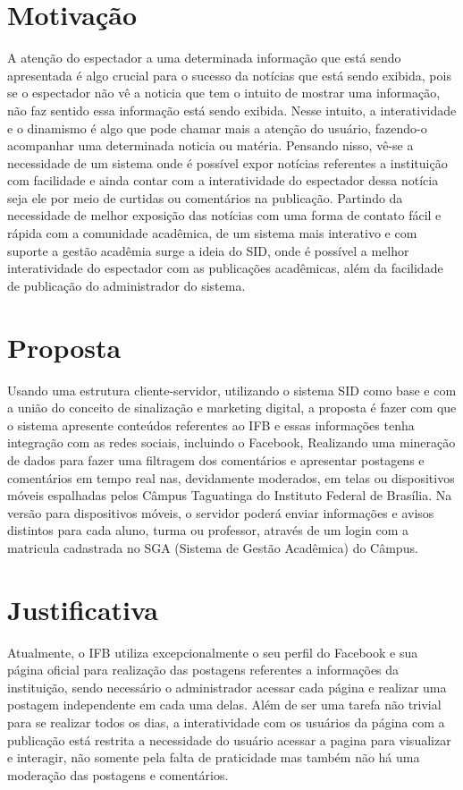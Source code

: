 \section{Motivação}
A atenção do espectador a uma determinada informação que está sendo apresentada é algo crucial para o sucesso da notícias que está sendo exibida, pois se o espectador não vê a noticia que tem o intuito de mostrar uma informação, não faz sentido essa informação está sendo exibida. Nesse intuito, a interatividade e o dinamismo é algo que pode chamar mais a atenção do usuário, fazendo-o acompanhar uma determinada noticia ou matéria. Pensando nisso, vê-se a necessidade de um sistema onde é possível expor notícias referentes a instituição com facilidade e ainda contar com a interatividade do espectador dessa notícia seja ele por meio de curtidas ou comentários na publicação. Partindo da necessidade de melhor exposição das notícias com uma forma de contato fácil e rápida com a comunidade acadêmica, de um sistema mais interativo e com suporte a gestão acadêmia surge a ideia do SID, onde é possível a melhor interatividade do espectador com as publicações acadêmicas, além da facilidade de publicação do administrador do sistema.

\section{Proposta}
Usando uma estrutura cliente-servidor, utilizando o sistema SID como base e com a união do conceito de sinalização e marketing digital, a proposta é fazer com que o sistema apresente conteúdos referentes ao IFB e essas informações tenha integração com as redes sociais, incluindo o Facebook, Realizando uma mineração de dados para fazer uma filtragem dos comentários e apresentar postagens e comentários em tempo real nas, devidamente moderados, em telas ou dispositivos móveis espalhadas pelos Câmpus Taguatinga do Instituto Federal de Brasília. Na versão para dispositivos móveis, o servidor poderá enviar informações e avisos distintos para cada aluno, turma ou professor, através de um login com a matricula cadastrada no SGA (Sistema de Gestão Acadêmica) do Câmpus.

\section{Justificativa}
Atualmente, o IFB utiliza excepcionalmente o seu perfil do Facebook e sua página oficial para realização das postagens referentes a informações da instituição, sendo necessário o administrador acessar cada página e realizar uma postagem independente em cada uma delas. Além de ser uma tarefa não trivial para se realizar todos os dias, a interatividade com os usuários da página com a publicação está restrita a necessidade do usuário acessar a pagina para visualizar e interagir, não somente pela falta de praticidade mas também não há uma moderação das postagens e comentários.

